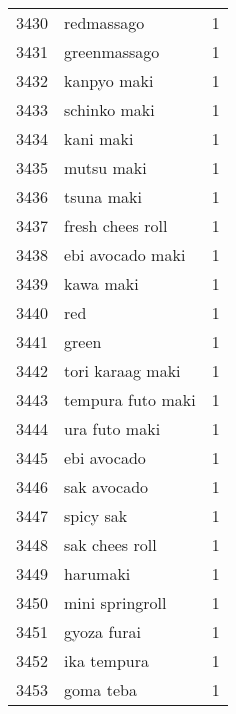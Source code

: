 \begin{tabular}{llr}
3430 &                                         redmassago &      1 \\
3431 &                                       greenmassago &      1 \\
3432 &                                        kanpyo maki &      1 \\
3433 &                                       schinko maki &      1 \\
3434 &                                          kani maki &      1 \\
3435 &                                         mutsu maki &      1 \\
3436 &                                         tsuna maki &      1 \\
3437 &                                   fresh chees roll &      1 \\
3438 &                                   ebi avocado maki &      1 \\
3439 &                                          kawa maki &      1 \\
3440 &                                                red &      1 \\
3441 &                                              green &      1 \\
3442 &                                   tori karaag maki &      1 \\
3443 &                                  tempura futo maki &      1 \\
3444 &                                      ura futo maki &      1 \\
3445 &                                        ebi avocado &      1 \\
3446 &                                        sak avocado &      1 \\
3447 &                                          spicy sak &      1 \\
3448 &                                     sak chees roll &      1 \\
3449 &                                           harumaki &      1 \\
3450 &                                    mini springroll &      1 \\
3451 &                                        gyoza furai &      1 \\
3452 &                                        ika tempura &      1 \\
3453 &                                          goma teba &      1 \\

\end{tabular}
